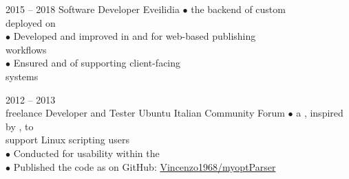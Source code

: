 \documentclass[9pt]{developercv} %
\newcommand{\myHilight}[2]{\tcbtp{\textit{\color{#1}{#2}}}}
\begin{document}
\begin{entrylist}
    \vspace{-1.2em}
	\entry
		{2015 -- 2018} %
		{Software Developer}
		{Eveilidia}
        {
            $\bullet$ \myHilight{textcolor}{Maintained and debugged} the backend 
                      of custom \myHilight{textcolor}{on-demand book publishing platforms}\\ 
                      \hspace*{0.7em}deployed on \myHilight{textcolor}{Linux Fedora}\\
            $\bullet$ Developed and improved \myHilight{textcolor}{server-side routines} 
                      in \myHilight{textcolor}{Bash} and \myHilight{textcolor}{Python} 
                      for web-based publishing\\
                      \hspace*{0.7em}workflows\\
            $\bullet$ Ensured \myHilight{textcolor}{operational stability} 
                      and \myHilight{textcolor}{performance} of \myHilight{textcolor}{internal services} 
                      supporting client-facing\\
                      \hspace*{0.7em}systems\\
        }

	\entry
		{2012 -- 2013\\\footnotesize{freelance}}
		{Developer and Tester}
		{Ubuntu Italian Community Forum}
        {
            $\bullet$ \myHilight{textcolor}{Initiated and co-developed} 
                      a \myHilight{textcolor}{command-line parser in C}, 
                      inspired by \myHilight{textcolor}{Python’s argparse}, to\\
                      \hspace*{0.7em}support Linux scripting users\\
            $\bullet$ Conducted \myHilight{textcolor}{testing and documentation} 
                      for usability within the \myHilight{textcolor}{Ubuntu Italian user base}\\
            $\bullet$ Published the code as \myHilight{textcolor}{myoptParser} 
                      on GitHub: \href{https://github.com/Vincenzo1968/myoptParser}{Vincenzo1968/myoptParser}\\
        }


\end{entrylist}
\end{document}
